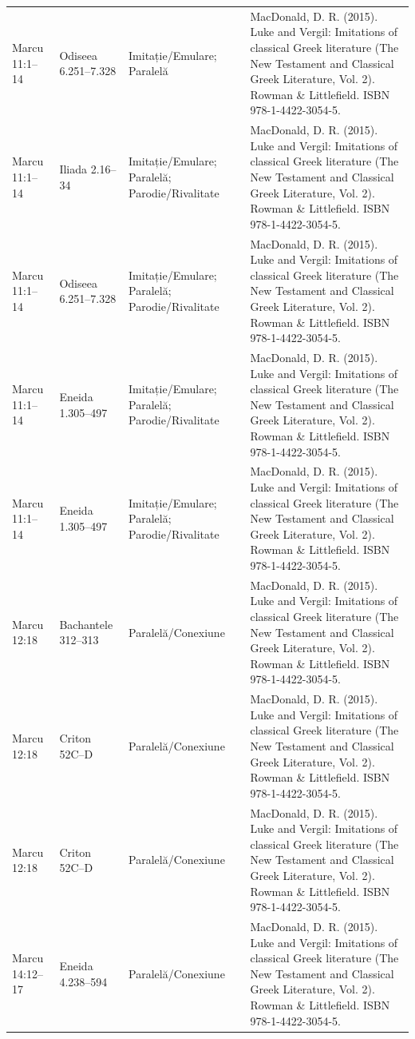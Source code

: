 \documentclass[12pt,a4paper,twoside,openany]{book}
\begin{document}
\begin{longtable}{L{1.4cm}L{1.7cm}L{3.1cm}L{8.4cm}}
Marcu 11:1–14 & Odiseea 6.251–7.328 & Imitație/Emulare; Paralelă & MacDonald, D. R. (2015). Luke and Vergil: Imitations of classical Greek literature (The New Testament and Classical Greek Literature, Vol. 2). Rowman \& Littlefield. ISBN 978-1-4422-3054-5. \\
Marcu 11:1–14 & Iliada 2.16–34 & Imitație/Emulare; Paralelă; Parodie/Rivalitate & MacDonald, D. R. (2015). Luke and Vergil: Imitations of classical Greek literature (The New Testament and Classical Greek Literature, Vol. 2). Rowman \& Littlefield. ISBN 978-1-4422-3054-5. \\
Marcu 11:1–14 & Odiseea 6.251–7.328 & Imitație/Emulare; Paralelă; Parodie/Rivalitate & MacDonald, D. R. (2015). Luke and Vergil: Imitations of classical Greek literature (The New Testament and Classical Greek Literature, Vol. 2). Rowman \& Littlefield. ISBN 978-1-4422-3054-5. \\
Marcu 11:1–14 & Eneida 1.305–497 & Imitație/Emulare; Paralelă; Parodie/Rivalitate & MacDonald, D. R. (2015). Luke and Vergil: Imitations of classical Greek literature (The New Testament and Classical Greek Literature, Vol. 2). Rowman \& Littlefield. ISBN 978-1-4422-3054-5. \\
Marcu 11:1–14 & Eneida 1.305–497 & Imitație/Emulare; Paralelă; Parodie/Rivalitate & MacDonald, D. R. (2015). Luke and Vergil: Imitations of classical Greek literature (The New Testament and Classical Greek Literature, Vol. 2). Rowman \& Littlefield. ISBN 978-1-4422-3054-5. \\
Marcu 12:18 & Bachantele 312–313 & Paralelă/Conexiune & MacDonald, D. R. (2015). Luke and Vergil: Imitations of classical Greek literature (The New Testament and Classical Greek Literature, Vol. 2). Rowman \& Littlefield. ISBN 978-1-4422-3054-5. \\
Marcu 12:18 & Criton 52C–D & Paralelă/Conexiune & MacDonald, D. R. (2015). Luke and Vergil: Imitations of classical Greek literature (The New Testament and Classical Greek Literature, Vol. 2). Rowman \& Littlefield. ISBN 978-1-4422-3054-5. \\
Marcu 12:18 & Criton 52C–D & Paralelă/Conexiune & MacDonald, D. R. (2015). Luke and Vergil: Imitations of classical Greek literature (The New Testament and Classical Greek Literature, Vol. 2). Rowman \& Littlefield. ISBN 978-1-4422-3054-5. \\
Marcu 14:12–17 & Eneida 4.238–594 & Paralelă/Conexiune & MacDonald, D. R. (2015). Luke and Vergil: Imitations of classical Greek literature (The New Testament and Classical Greek Literature, Vol. 2). Rowman \& Littlefield. ISBN 978-1-4422-3054-5. \\

\end{longtable}
\end{document}

